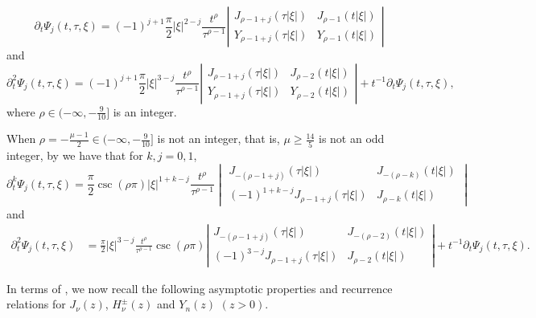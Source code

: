 \documentclass[11pt,twoside]{article}
\newcommand{\p}{\partial}
\newcommand{\f}{\frac}
\theoremstyle{plain}
\theoremstyle{definition}
\theoremstyle{remark}
\numberwithin{equation}{section}
\begin{document}
\begin{equation}\label{equ:q9-4}
\partial_{t} \Psi_{j}(t, \tau, \xi)=(-1)^{j+1} \frac{\pi}{2}|\xi|^{2-j} \frac{t^{\rho}}{\tau^{\rho-1}}\left|\begin{array}{ll}
J_{\rho-1+j}(\tau|\xi|) & J_{\rho-1}(t|\xi|)  \\
Y_{\rho-1+j}(\tau|\xi|) & Y_{\rho-1}(t|\xi|)
\end{array}\right|
\end{equation}
and
\begin{equation}\label{equ:q9-5}
\partial_{t}^2 \Psi_{j}(t, \tau, \xi)=(-1)^{j+1} \frac{\pi}{2}|\xi|^{3-j} \frac{t^{\rho}}{\tau^{\rho-1}}\left|\begin{array}{ll}
J_{\rho-1+j}(\tau|\xi|) & J_{\rho-2}(t|\xi|)  \\
Y_{\rho-1+j}(\tau|\xi|) & Y_{\rho-2}(t|\xi|)
\end{array}\right|+t^{-1}\p_t\Psi_{j}(t, \tau, \xi),
\end{equation}
where $\rho\in(-\infty, -\f{9}{10}]$ is  an integer.

When $\rho=-\f{\mu-1}{2}\in(-\infty, -\f{9}{10}]$ is not an integer, that is,  $\mu\geq \f{14}{5}$ is not an odd integer,
by \cite[Section 2]{LY} we have that for $k,j=0,1$,
\begin{equation}\label{equ:q9-5'}
\partial_t^k \Psi_j(t,\tau,\xi)
=
\frac{\pi}{2}\csc(\rho\pi)
|\xi|^{1+k-j}
\frac{t^\rho}{\tau^{\rho-1}}
\begin{vmatrix}
J_{-(\rho-1+j)}(\tau|\xi|) & J_{-(\rho-k)}(t|\xi|) \\
(-1)^{1+k-j}J_{\rho-1+j}(\tau|\xi|) & J_{\rho-k}(t|\xi|)
\end{vmatrix}
\end{equation}
and
\begin{equation}\label{l-3}
\begin{aligned}
\p_t^2\Psi_{j}(t, \tau, \xi)
& =\frac{\pi}{2}|\xi|^{3-j} \frac{t^{\rho}}{\tau^{\rho-1}}\csc(\rho\pi)\left|\begin{array}{ll}
J_{-(\rho-1+j)}(\tau|\xi|) & J_{-(\rho-2)}(t|\xi|) \\
(-1)^{3-j}J_{\rho-1+j}(\tau|\xi|) & J_{\rho-2}(t|\xi|)
\end{array}\right|+ t^{-1}\p_t\Psi_{j}(t, \tau, \xi).
\end{aligned}
\end{equation}


In terms of \cite[Section 10]{OLBC}, we now recall the following asymptotic properties and recurrence relations for
$J_{\nu}(z)$, $H_{\nu}^{\pm}(z)$ and $Y_{n}(z)$ $(z>0)$.
\end{document}
